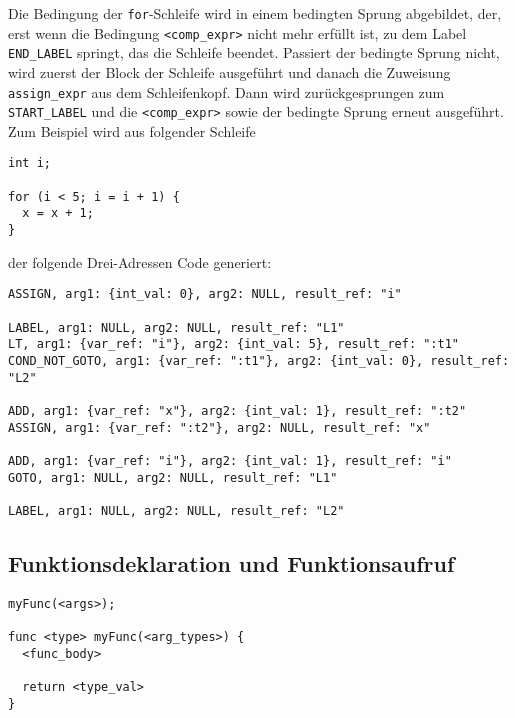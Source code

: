 Die Bedingung der \texttt{for}-Schleife wird in einem bedingten Sprung abgebildet, der, erst wenn die Bedingung  \texttt{<comp\_expr>} nicht mehr erfüllt ist, zu dem Label \texttt{END\_LABEL} springt, das die Schleife beendet.
Passiert der bedingte Sprung nicht, wird zuerst der Block der Schleife ausgeführt und danach die Zuweisung \texttt{assign\_expr} aus dem Schleifenkopf.
Dann wird zurückgesprungen zum \texttt{START\_LABEL} und die \texttt{<comp\_expr>} sowie der bedingte Sprung erneut ausgeführt.\\

Zum Beispiel wird aus folgender Schleife

\begin{lstlisting}[caption={Beispielschleife}]
int i;

for (i < 5; i = i + 1) {
  x = x + 1;
}
\end{lstlisting}

der folgende Drei-Adressen Code generiert:

\begin{lstlisting}[caption={Drei-Adressen Code für for-Schleifen}]
ASSIGN, arg1: {int_val: 0}, arg2: NULL, result_ref: "i"

LABEL, arg1: NULL, arg2: NULL, result_ref: "L1"
LT, arg1: {var_ref: "i"}, arg2: {int_val: 5}, result_ref: ":t1"
COND_NOT_GOTO, arg1: {var_ref: ":t1"}, arg2: {int_val: 0}, result_ref: "L2"

ADD, arg1: {var_ref: "x"}, arg2: {int_val: 1}, result_ref: ":t2"
ASSIGN, arg1: {var_ref: ":t2"}, arg2: NULL, result_ref: "x"

ADD, arg1: {var_ref: "i"}, arg2: {int_val: 1}, result_ref: "i"
GOTO, arg1: NULL, arg2: NULL, result_ref: "L1"

LABEL, arg1: NULL, arg2: NULL, result_ref: "L2"
\end{lstlisting}

\subsection{Funktionsdeklaration und Funktionsaufruf}

\begin{lstlisting}[caption={Vorlage Funktionsdeklaration und Funktionsaufruf}]
myFunc(<args>);

func <type> myFunc(<arg_types>) {
  <func_body>

  return <type_val>
}
\end{lstlisting}


